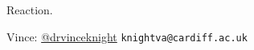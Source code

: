 \documentclass{beamer}
\begin{document}
    \begin{frame}
        \begin{center}
            \Large
            Reaction.
        \end{center}
    \end{frame}

    \begin{frame}
        \begin{center}
            \normalsize
            Vince: \href{https://twitter.com/drvinceknight}{@drvinceknight}
            \texttt{knightva@cardiff.ac.uk}
        \end{center}
    \end{frame}
\end{document}
